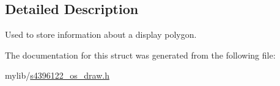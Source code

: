 \subsection{Detailed Description}
Used to store information about a display polygon. 

The documentation for this struct was generated from the following file\+:\begin{DoxyCompactItemize}
\item 
mylib/\hyperlink{s4396122__os__draw_8h}{s4396122\+\_\+os\+\_\+draw.\+h}\end{DoxyCompactItemize}
